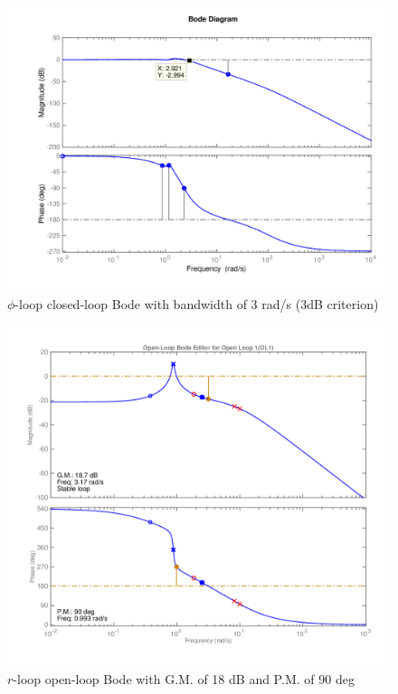 \documentclass[12pt]{article}
\begin{document}
\begin{figure}[h!]
\begin{center}
\includegraphics[height=.375\textheight]{figures/phi_delta_a_closed_loop}
\caption{$\phi$-loop closed-loop Bode with bandwidth of 3 rad/s (3dB criterion)}
\end{center}
\end{figure}

\begin{figure}[h!]
\begin{center}
\includegraphics[height=.435\textheight]{figures/r_delta_r_open_loop}
\caption{$r$-loop open-loop Bode with G.M. of 18 dB and P.M. of 90 deg}
\end{center}
\end{figure}
\end{document}

